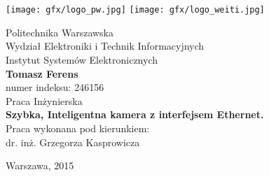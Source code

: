 
\begin{titlepage}


\begin{center}
\hfill \\
\vspace{0.1cm} 
\hfill \\
 
\texttt{[image: gfx/logo\_pw.jpg]}\hfill
\texttt{[image: gfx/logo\_weiti.jpg]}\\ \medskip %
\large
\hfill
\vfill

\begingroup
{\Large Politechnika Warszawska} \\ 
{\Large Wydział Elektroniki i Technik Informacyjnych} \\ 
{\Large Instytut Systemów Elektronicznych} \\ \bigskip
\vfill
{\Huge \textbf{Tomasz Ferens}} \\ %
{numer indeksu: 246156} \\ \bigskip
\vfill
{\large Praca Inżynierska} \\ \medskip %
{\LARGE {\textbf{Szybka, Inteligentna kamera z interfejsem Ethernet.}}} \\ \bigskip %
\endgroup
\vfill
\hfill {Praca wykonana pod kierunkiem:} \\ %
\hfill {dr. inż. Grzegorza Kasprowicza} %
\vfill
\vspace{3cm}

Warszawa, 2015



\end{center}


\end{titlepage}
